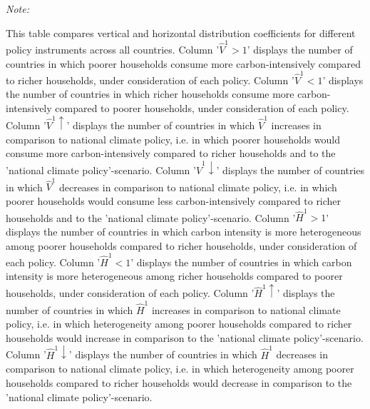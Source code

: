 \begingroup\fontsize{9}{11}\selectfont

\begin{ThreePartTable}
\begin{TableNotes}
\item \textit{Note: } 
\item This table compares vertical and horizontal distribution coefficients for different policy instruments across all countries. 
           Column '$\hat{V}^{1} > 1$' displays the number of countries in which poorer households consume more carbon-intensively compared to richer households, under consideration of each policy.
           Column '$\hat{V}^{1} < 1$' displays the number of countries in which richer households consume more carbon-intensively compared to poorer households, under consideration of each policy.
           Column '$\hat{V}^{1} \uparrow$' displays the number of countries in which $\hat{V}^{1}$ increases in comparison to national climate policy, i.e. in which poorer households would consume more carbon-intensively compared to richer households and to the 'national climate policy'-scenario.
           Column '$\hat{V}^{1} \downarrow$' displays the number of countries in which $\hat{V}^{1}$ decreases in comparison to national climate policy, i.e. in which poorer households would consume less carbon-intensively compared to richer households and to the 'national climate policy'-scenario.
           Column '$\hat{H}^{1} > 1$' displays the number of countries in which carbon intensity is more heterogeneous among poorer households compared to richer households, under consideration of each policy.
           Column '$\hat{H}^{1} < 1$' displays the number of countries in which carbon intensity is more heterogeneous among richer households compared to poorer households, under consideration of each policy.
           Column '$\hat{H}^{1} \uparrow$' displays the number of countries in which $\hat{H}^{1}$ increases in comparison to national climate policy, i.e. in which heterogeneity among poorer households compared to richer households would increase in comparison to the 'national climate policy'-scenario.
           Column '$\hat{H}^{1} \downarrow$' displays the number of countries in which $\hat{H}^{1}$ decreases in comparison to national climate policy, i.e. in which heterogeneity among poorer households compared to richer households would decrease in comparison to the 'national climate policy'-scenario.
\end{TableNotes}
\begin{longtable}[t]{l|cc|cc|cc|ccl|cc|cc|cc|ccl|cc|cc|cc|ccl|cc|cc|cc|ccl|cc|cc|cc|ccl|cc|cc|cc|ccl|cc|cc|cc|ccl|cc|cc|cc|ccl|cc|cc|cc|cc}

\end{longtable}
\end{ThreePartTable}
